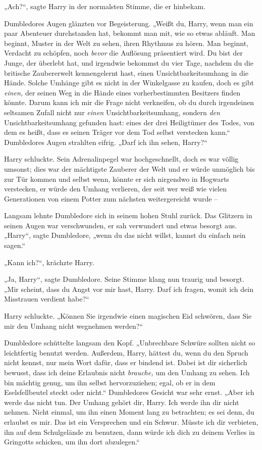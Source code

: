 {„Ach?“, sagte Harry in der normalsten Stimme, die er hinbekam.

Dumbledores Augen glänzten vor Begeisterung. „Weißt du, Harry, wenn man ein paar Abenteuer durchstanden hat, bekommt man mit, wie so etwas abläuft. Man beginnt, Muster in der Welt zu sehen, ihren Rhythmus zu hören. Man beginnt, Verdacht zu schöpfen, noch \emph{bevor} die Auflösung präsentiert wird. Du bist der Junge, der überlebt hat, und irgendwie bekommst du vier Tage, nachdem du die britische Zaubererwelt kennengelernt hast, einen Unsichtbarkeitsumhang in die Hände. Solche Umhänge gibt es nicht in der Winkelgasse zu kaufen, doch es gibt \emph{einen,} der seinen Weg in die Hände eines vorherbestimmten Besitzers finden könnte. Darum kann ich mir die Frage nicht verkneifen, ob du durch irgendeinen seltsamen Zufall nicht nur \emph{einen} Unsichtbarkeitsumhang, sondern \emph{den} Unsichtbarkeitsumhang gefunden hast: eines der drei Heiligtümer des Todes, von dem es heißt, dass es seinen Träger vor dem Tod selbst verstecken kann.“ Dumbledores Augen strahlten eifrig. „Darf ich ihn sehen, Harry?“

Harry schluckte. Sein Adrenalinpegel war hochgeschnellt, doch es war völlig umsonst; dies war der mächtigste Zauberer der Welt und er würde unmöglich bis zur Tür kommen und selbst wenn, könnte er sich nirgendwo in Hogwarts verstecken, er würde den Umhang verlieren, der seit wer weiß wie vielen Generationen von einem Potter zum nächsten weitergereicht wurde --

Langsam lehnte Dumbledore sich in seinem hohen Stuhl zurück. Das Glitzern in seinen Augen war verschwunden, er sah verwundert und etwas besorgt aus. „Harry“, sagte Dumbledore, „wenn du das nicht willst, kannst du einfach nein sagen.“

„Kann ich?“, krächzte Harry.

„Ja, Harry“, sagte Dumbledore. Seine Stimme klang nun traurig und besorgt. „Mir scheint, dass du Angst vor mir hast, Harry. Darf ich fragen, womit ich dein Misstrauen verdient habe?“

Harry schluckte. „Können Sie irgendwie einen magischen Eid schwören, dass Sie mir den Umhang nicht wegnehmen werden?“

Dumbledore schüttelte langsam den Kopf. „Unbrechbare Schwüre sollten nicht so leichtfertig benutzt werden. Außerdem, Harry, hättest du, wenn du den Spruch nicht kennst, nur mein Wort dafür, dass er bindend ist. Dabei ist dir sicherlich bewusst, dass ich deine Erlaubnis nicht \emph{brauche,} um den Umhang zu sehen. Ich bin mächtig genug, um ihn selbst hervorzuziehen; egal, ob er in dem Eselsfellbeutel steckt oder nicht.“ Dumbledores Gesicht war sehr ernst. „Aber ich werde das nicht tun. Der Umhang gehört dir, Harry. Ich werde ihn dir nicht nehmen. Nicht einmal, um ihn einen Moment lang zu betrachten; es sei denn, du erlaubst es mir. Das ist ein Versprechen und ein Schwur. Müsste ich dir verbieten, ihn auf dem Schulgelände zu benutzen, dann würde ich dich zu deinem Verlies in Gringotts schicken, um ihn dort abzulegen.“

}
